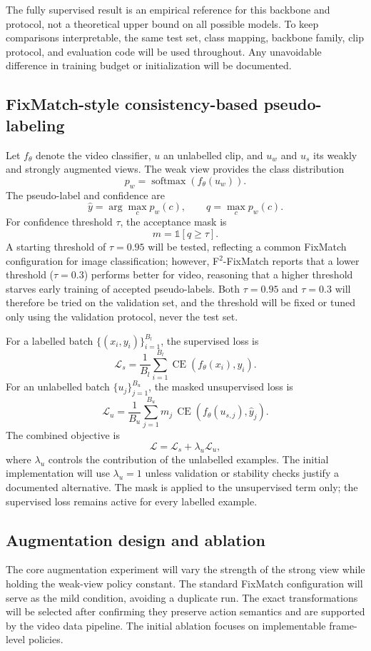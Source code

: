 \documentclass[11pt,a4paper]{article}
\begin{document}
The fully supervised result is an empirical reference for this backbone and protocol, not a theoretical upper bound on all possible models. To keep comparisons interpretable, the same test set, class mapping, backbone family, clip protocol, and evaluation code will be used throughout. Any unavoidable difference in training budget or initialization will be documented.

\subsection{FixMatch-style consistency-based pseudo-labeling}
Let $f_\theta$ denote the video classifier, $u$ an unlabelled clip, and $u_w$ and $u_s$ its weakly and strongly augmented views. The weak view provides the class distribution
\[
p_w = \operatorname{softmax}(f_\theta(u_w)).
\]
The pseudo-label and confidence are
\[
\hat{y}=\arg\max_c p_w(c), \qquad q=\max_c p_w(c).
\]
For confidence threshold $\tau$, the acceptance mask is
\[
m=\mathbb{1}[q\geq\tau].
\]
A starting threshold of $\tau=0.95$ will be tested, reflecting a common FixMatch configuration for image classification; however, F$^2$-FixMatch \cite{f2fixmatch} reports that a lower threshold ($\tau=0.3$) performs better for video, reasoning that a higher threshold starves early training of accepted pseudo-labels. Both $\tau=0.95$ and $\tau=0.3$ will therefore be tried on the validation set, and the threshold will be fixed or tuned only using the validation protocol, never the test set.

For a labelled batch $\{(x_i,y_i)\}_{i=1}^{B_l}$, the supervised loss is
\[
\mathcal{L}_{s} =
\frac{1}{B_l}\sum_{i=1}^{B_l}
\operatorname{CE}\!\left(f_\theta(x_i),y_i\right).
\]
For an unlabelled batch $\{u_j\}_{j=1}^{B_u}$, the masked unsupervised loss is
\[
\mathcal{L}_{u} =
\frac{1}{B_u}\sum_{j=1}^{B_u}
m_j\,\operatorname{CE}\!\left(f_\theta(u_{s,j}),\hat{y}_j\right).
\]
The combined objective is
\[
\mathcal{L}=\mathcal{L}_{s}+\lambda_u\mathcal{L}_{u},
\]
where $\lambda_u$ controls the contribution of the unlabelled examples. The initial implementation will use $\lambda_u=1$ unless validation or stability checks justify a documented alternative. The mask is applied to the unsupervised term only; the supervised loss remains active for every labelled example.

\subsection{Augmentation design and ablation}
The core augmentation experiment will vary the strength of the strong view while holding the weak-view policy constant. The standard FixMatch configuration will serve as the mild condition, avoiding a duplicate run. The exact transformations will be selected after confirming they preserve action semantics and are supported by the video data pipeline. The initial ablation focuses on implementable frame-level policies.
\end{document}
